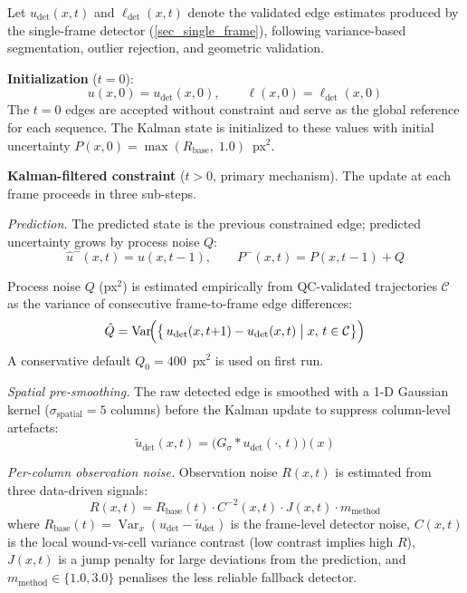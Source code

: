 Let $u_\text{det}(x, t)$ and $\ell_\text{det}(x, t)$ denote the validated edge estimates produced by the single-frame detector (\ref{sec_single_frame}), following variance-based segmentation, outlier rejection, and geometric validation.


\textbf{Initialization} ($t = 0$):
\begin{equation}
  u(x, 0) = u_\text{det}(x, 0), \qquad \ell(x, 0) = \ell_\text{det}(x, 0)
\end{equation}
The $t = 0$ edges are accepted without constraint and serve as the global reference for each sequence.
The Kalman state is initialized to these values with initial uncertainty
$P(x, 0) = \max(R_\text{base},\; 1.0)$~px$^2$.

\textbf{Kalman-filtered constraint} ($t > 0$, primary mechanism).
The update at each frame proceeds in three sub-steps.

\emph{Prediction.}
The predicted state is the previous constrained edge; predicted uncertainty grows by process
noise $Q$:
\begin{equation}
  \hat{u}^-(x, t) = u(x, t-1), \qquad P^-(x, t) = P(x, t-1) + Q
  \label{eq:kalman-predict}
\end{equation}

Process noise $Q$ (px$^2$) is estimated empirically from QC-validated trajectories
$\mathcal{C}$ as the variance of consecutive frame-to-frame edge differences:
\begin{equation}
  \hat{Q} = \operatorname{Var}\!\Bigl(\bigl\{\,u_\text{det}(x,t{+}1) - u_\text{det}(x,t)\;\big|\; x,\,t \in \mathcal{C}\bigr\}\Bigr)
  \label{eq:Q-estimate}
\end{equation}
A conservative default $Q_0 = 400$~px$^2$ is used on first run.

\emph{Spatial pre-smoothing.}
The raw detected edge is smoothed with a 1-D Gaussian kernel ($\sigma_\text{spatial} = 5$
columns) before the Kalman update to suppress column-level artefacts:
\begin{equation}
  \tilde{u}_\text{det}(x, t) = \bigl(G_{\sigma} * u_\text{det}(\cdot,\, t)\bigr)(x)
  \label{eq:spatial-smooth}
\end{equation}

\emph{Per-column observation noise.}
Observation noise $R(x, t)$ is estimated from three data-driven signals:
\begin{equation}
  R(x, t) = R_\text{base}(t) \cdot C^{-2}(x, t) \cdot J(x, t) \cdot m_\text{method}
  \label{eq:R-estimate}
\end{equation}
where $R_\text{base}(t) = \operatorname{Var}_{x}(u_\text{det} - \tilde{u}_\text{det})$
is the frame-level detector noise, $C(x,t)$ is the local wound-vs-cell variance contrast
(low contrast implies high $R$), $J(x,t)$ is a jump penalty for large deviations from the
prediction, and $m_\text{method} \in \{1.0, 3.0\}$ penalises the less reliable fallback
detector.

